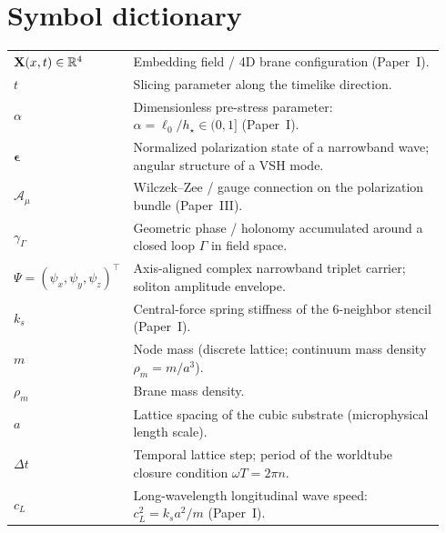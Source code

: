 \section[\appendixname~\thesection]{Symbol dictionary}
\label{sec:symbols}

\begin{center}
\begin{tabular}{p{0.22\linewidth} p{0.72\linewidth}}
$\mathbf{X}(x,t)\in\mathbb{R}^4$ & Embedding field / 4D brane configuration (Paper~I).\\
$t$ & Slicing parameter along the timelike direction.\\
$\alpha$ & Dimensionless pre-stress parameter: $\alpha=\ell_0/h_\star\in(0,1]$ (Paper~I).\\
$\bm{\epsilon}$ & Normalized polarization state of a narrowband wave; angular structure of a VSH mode.\\
$\mathcal{A}_\mu$ & Wilczek--Zee / gauge connection on the polarization bundle (Paper~III).\\
$\gamma_\Gamma$ & Geometric phase / holonomy accumulated around a closed loop $\Gamma$ in field space.\\
$\Psi=(\psi_x,\psi_y,\psi_z)^\top$ & Axis-aligned complex narrowband triplet carrier; soliton amplitude envelope.\\
$k_s$ & Central-force spring stiffness of the 6-neighbor stencil (Paper~I).\\
$m$ & Node mass (discrete lattice; continuum mass density $\rho_m=m/a^3$).\\
$\rho_m$ & Brane mass density.\\
$a$ & Lattice spacing of the cubic substrate (microphysical length scale).\\
$\Delta t$ & Temporal lattice step; period of the worldtube closure condition $\omega T=2\pi n$.\\
$c_L$ & Long-wavelength longitudinal wave speed: $c_L^2=k_s a^2/m$ (Paper~I).\\
\end{tabular}
\end{center}
